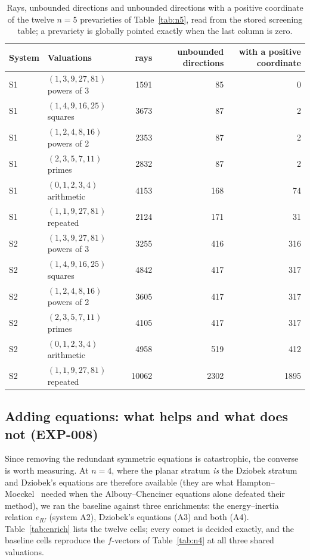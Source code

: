 \documentclass[11pt]{article}
\theoremstyle{definition}
\theoremstyle{remark}
\begin{document}
\begin{table}[t]\centering\footnotesize\setlength{\tabcolsep}{3pt}
\begin{tabular}{@{}llrrr@{}}
\toprule
System & Valuations & rays & unbounded directions & with a positive coordinate \\
\midrule
S1 & $(1,3,9,27,81)$ powers of 3 & 1591 & 85 & 0 \\
S1 & $(1,4,9,16,25)$ squares & 3673 & 87 & 2 \\
S1 & $(1,2,4,8,16)$ powers of 2 & 2353 & 87 & 2 \\
S1 & $(2,3,5,7,11)$ primes & 2832 & 87 & 2 \\
S1 & $(0,1,2,3,4)$ arithmetic & 4153 & 168 & 74 \\
S1 & $(1,1,9,27,81)$ repeated & 2124 & 171 & 31 \\
\midrule
S2 & $(1,3,9,27,81)$ powers of 3 & 3255 & 416 & 316 \\
S2 & $(1,4,9,16,25)$ squares & 4842 & 417 & 317 \\
S2 & $(1,2,4,8,16)$ powers of 2 & 3605 & 417 & 317 \\
S2 & $(2,3,5,7,11)$ primes & 4105 & 417 & 317 \\
S2 & $(0,1,2,3,4)$ arithmetic & 4958 & 519 & 412 \\
S2 & $(1,1,9,27,81)$ repeated & 10062 & 2302 & 1895 \\
\bottomrule
\end{tabular}
\caption{Rays, unbounded directions and unbounded directions with a positive coordinate of the twelve $n=5$ prevarieties of Table~\ref{tab:n5}, read from the
stored screening table; a prevariety is globally pointed exactly when the last column is zero.}\label{tab:rays}
\end{table}

\subsection{Adding equations: what helps and what does not (EXP-008)}\label{sec:adding}

Since removing the redundant symmetric equations is catastrophic, the converse is
worth measuring. At $n=4$, where the planar stratum \emph{is} the Dziobek stratum
and Dziobek's equations are therefore available (they are what
Hampton--Moeckel~\cite{HM06} needed when the Albouy--Chenciner equations alone
defeated their method), we ran the baseline against three enrichments: the energy--inertia
relation $e_{IU}$ (system A2), Dziobek's equations (A3) and both (A4). Table~\ref{tab:enrich} lists the
twelve cells; every comet is decided exactly, and the baseline cells reproduce the
$f$-vectors of Table~\ref{tab:n4} at all three shared valuations.
\end{document}

